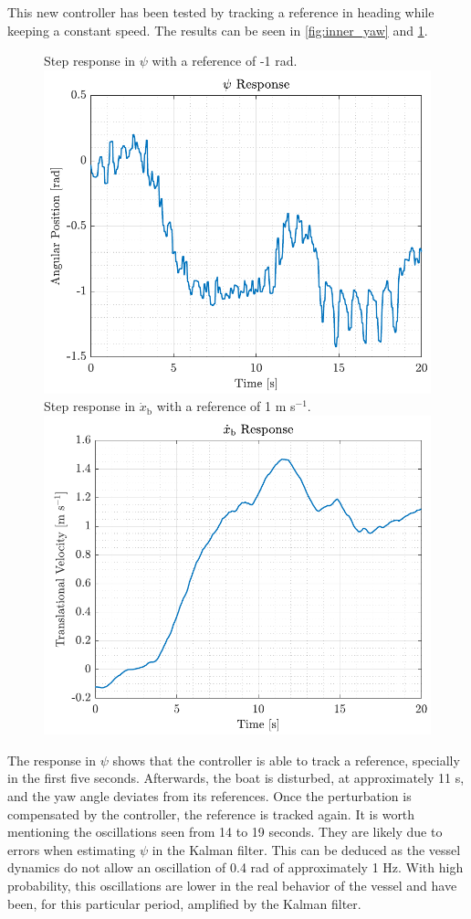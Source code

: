 This new controller has been tested by tracking a reference in heading while keeping a constant speed. The results can be seen in \autoref{fig:inner_yaw} and \ref{fig:inner_xbdot}.
%
\begin{figure}[H]
    \captionbox 
    {   
        Step response in $\psi$ with a reference of -1 rad.
        \label{fig:inner_yaw}
    }                                                                 
    {                                                                  
        \includegraphics[width=.45\textwidth]{figures/inner_yaw}         
    }                                                                    
    \hspace{5pt}                                                          
    \captionbox  
    {      
        Step response in $\dot{x}_\mathrm{b}$ with a reference of 1 m s$^{-1}$.
        \label{fig:inner_xbdot}
    }                                                                          
    {
        \includegraphics[width=.45\textwidth]{figures/inner_xbdot}
    }
\end{figure}

The response in $\psi$ shows that the controller is able to track a reference, specially in the first five seconds. Afterwards, the boat is disturbed, at approximately 11 s, and the yaw angle deviates from its references. Once the perturbation is compensated by the controller, the reference is tracked again. It is worth mentioning the oscillations seen from 14 to 19 seconds. They are likely due to errors when estimating $\psi$ in the Kalman filter. This can be deduced as the vessel dynamics do not allow an oscillation of 0.4 rad of approximately 1 Hz. With high probability, this oscillations are lower in the real behavior of the vessel and have been, for this particular period, amplified by the Kalman filter.

